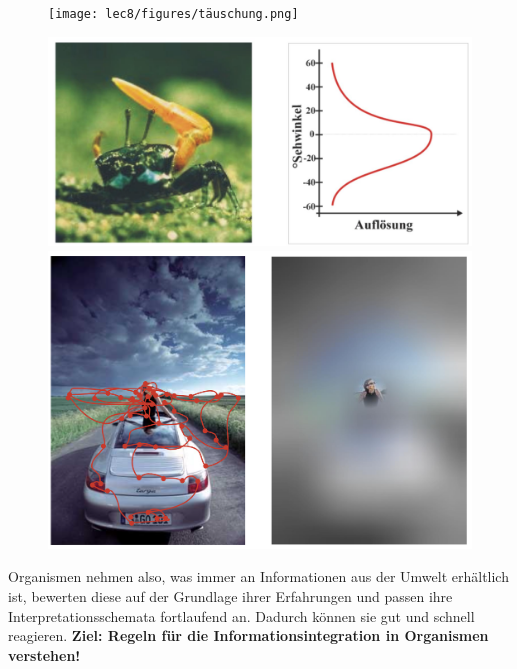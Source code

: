 \begin{figure}[!h]
  \centering
  \texttt{[image: lec8/figures/täuschung.png]}
  \hfill
  \begin{minipage}{.45\linewidth}
    \includegraphics[width=\linewidth]{lec8/figures/krebs.png}
    \\
    \includegraphics[width=\linewidth]{lec8/figures/fokus.png}
  \end{minipage}
\end{figure}
Organismen nehmen also, was immer an Informationen aus der Umwelt erhältlich ist, bewerten diese auf der Grundlage ihrer Erfahrungen und passen ihre Interpretationsschemata fortlaufend an. Dadurch können sie gut und schnell reagieren. \textbf{Ziel: Regeln für die Informationsintegration in Organismen verstehen!}

